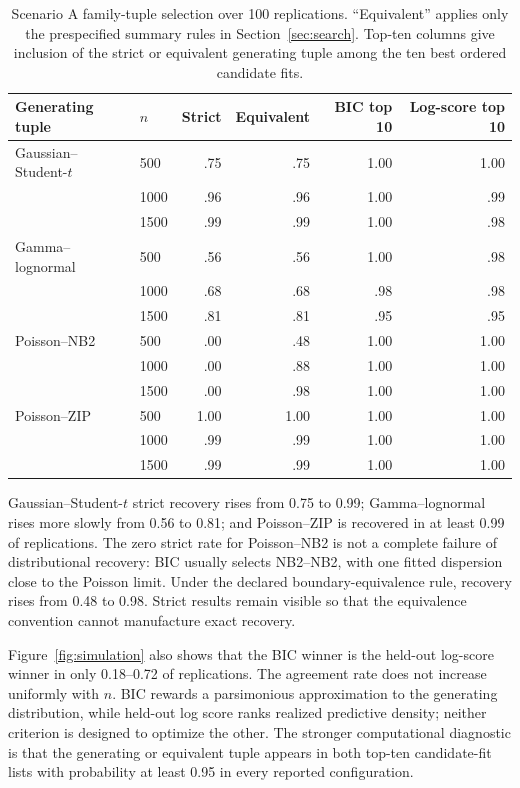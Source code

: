\documentclass[a4paper,fleqn]{cas-sc}
\begin{document}
\begin{table}[t]
\centering
\caption{Scenario A family-tuple selection over 100 replications. ``Equivalent'' applies only the prespecified summary rules in Section~\ref{sec:search}. Top-ten columns give inclusion of the strict or equivalent generating tuple among the ten best ordered candidate fits.}
\label{tab:sim-selection}
\small
\begin{tabular}{llrrrr}
\toprule
Generating tuple & $n$ & Strict & Equivalent & BIC top 10 & Log-score top 10 \\
\midrule
Gaussian--Student-$t$ & 500  & .75 & .75 & 1.00 & 1.00 \\
 & 1000 & .96 & .96 & 1.00 & .99 \\
 & 1500 & .99 & .99 & 1.00 & .98 \\
Gamma--lognormal & 500  & .56 & .56 & 1.00 & .98 \\
 & 1000 & .68 & .68 & .98 & .98 \\
 & 1500 & .81 & .81 & .95 & .95 \\
Poisson--NB2 & 500  & .00 & .48 & 1.00 & 1.00 \\
 & 1000 & .00 & .88 & 1.00 & 1.00 \\
 & 1500 & .00 & .98 & 1.00 & 1.00 \\
Poisson--ZIP & 500  & 1.00 & 1.00 & 1.00 & 1.00 \\
 & 1000 & .99 & .99 & 1.00 & 1.00 \\
 & 1500 & .99 & .99 & 1.00 & 1.00 \\
\bottomrule
\end{tabular}
\end{table}

Gaussian--Student-$t$ strict recovery rises from 0.75 to 0.99; Gamma--lognormal rises more slowly from 0.56 to 0.81; and Poisson--ZIP is recovered in at least 0.99 of replications. The zero strict rate for Poisson--NB2 is not a complete failure of distributional recovery: BIC usually selects NB2--NB2, with one fitted dispersion close to the Poisson limit. Under the declared boundary-equivalence rule, recovery rises from 0.48 to 0.98. Strict results remain visible so that the equivalence convention cannot manufacture exact recovery.

Figure~\ref{fig:simulation} also shows that the BIC winner is the held-out log-score winner in only 0.18--0.72 of replications. The agreement rate does not increase uniformly with $n$. BIC rewards a parsimonious approximation to the generating distribution, while held-out log score ranks realized predictive density; neither criterion is designed to optimize the other. The stronger computational diagnostic is that the generating or equivalent tuple appears in both top-ten candidate-fit lists with probability at least 0.95 in every reported configuration.
\end{document}
